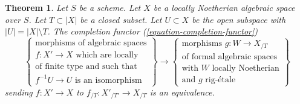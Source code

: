 \documentclass{stacks-project}
\theoremstyle{plain}
\newtheorem{theorem}[subsection]{Theorem}
\theoremstyle{definition}
\theoremstyle{remark}
\numberwithin{equation}{subsection}
\begin{document}
\begin{theorem}
\label{theorem-dilatations-general}
Let $S$ be a scheme. Let $X$ be a locally Noetherian algebraic space over $S$.
Let $T \subset |X|$ be a closed subset. Let $U \subset X$ be the open subspace
with $|U| = |X| \setminus T$. The completion functor
(\ref{equation-completion-functor})
$$
\left\{
\begin{matrix}
\text{morphisms of algebraic spaces}\\
f : X' \to X\text{ which are locally}\\
\text{of finite type and such that}\\
f^{-1}U \to U\text{ is an isomorphism}
\end{matrix}
\right\}
\longrightarrow
\left\{
\begin{matrix}
\text{morphisms }g : W \to X_{/T}\\
\text{of formal algebraic spaces}\\
\text{with }W\text{ locally Noetherian}\\
\text{and }g\text{ rig-\'etale}
\end{matrix}
\right\}
$$
sending $f : X' \to X$ to $f_{/T} : X'_{/T'} \to X_{/T}$ is an equivalence.
\end{theorem}
\end{document}
